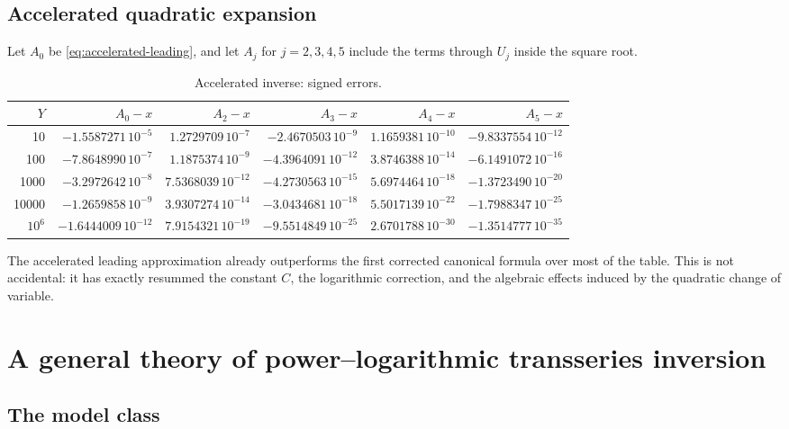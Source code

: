 \documentclass[11pt,a4paper]{article}
\numberwithin{equation}{section}
\theoremstyle{remark}
\begin{document}
\subsection{Accelerated quadratic expansion}

Let \(A_0\) be \cref{eq:accelerated-leading}, and let \(A_j\) for
\(j=2,3,4,5\) include the terms through \(U_j\) inside the square root.

\begin{table}[htbp]
\centering
\scriptsize
\caption{Accelerated inverse: signed errors.}
\label{tab:accelerated-errors}
\begin{tabular}{@{}r r r r r r@{}}
\toprule
\(Y\) & \(A_0-x\) & \(A_2-x\) & \(A_3-x\) & \(A_4-x\) & \(A_5-x\)\\
\midrule
10
& \(-1.5587271\,10^{-5}\)
& \(1.2729709\,10^{-7}\)
& \(-2.4670503\,10^{-9}\)
& \(1.1659381\,10^{-10}\)
& \(-9.8337554\,10^{-12}\)\\
100
& \(-7.8648990\,10^{-7}\)
& \(1.1875374\,10^{-9}\)
& \(-4.3964091\,10^{-12}\)
& \(3.8746388\,10^{-14}\)
& \(-6.1491072\,10^{-16}\)\\
1000
& \(-3.2972642\,10^{-8}\)
& \(7.5368039\,10^{-12}\)
& \(-4.2730563\,10^{-15}\)
& \(5.6974464\,10^{-18}\)
& \(-1.3723490\,10^{-20}\)\\
10000
& \(-1.2659858\,10^{-9}\)
& \(3.9307274\,10^{-14}\)
& \(-3.0434681\,10^{-18}\)
& \(5.5017139\,10^{-22}\)
& \(-1.7988347\,10^{-25}\)\\
\(10^6\)
& \(-1.6444009\,10^{-12}\)
& \(7.9154321\,10^{-19}\)
& \(-9.5514849\,10^{-25}\)
& \(2.6701788\,10^{-30}\)
& \(-1.3514777\,10^{-35}\)\\
\bottomrule
\end{tabular}
\end{table}

The accelerated leading approximation already outperforms the first
corrected canonical formula over most of the table.  This is not accidental:
it has exactly resummed the constant \(C\), the logarithmic correction, and
the algebraic effects induced by the quadratic change of variable.

\section{A general theory of power--logarithmic transseries inversion}
\label{sec:general-theory}

\subsection{The model class}
\end{document}
